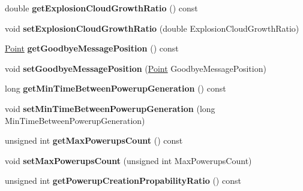 \begin{DoxyCompactItemize}
\item 
double {\bfseries get\+Explosion\+Cloud\+Growth\+Ratio} () const \hypertarget{classGameConfiguration_a987f4641ac6a04e60aabcf40022a42fc}{}\label{classGameConfiguration_a987f4641ac6a04e60aabcf40022a42fc}

\item 
void {\bfseries set\+Explosion\+Cloud\+Growth\+Ratio} (double Explosion\+Cloud\+Growth\+Ratio)\hypertarget{classGameConfiguration_a14d98de8fa9361f156856311d9a4be4e}{}\label{classGameConfiguration_a14d98de8fa9361f156856311d9a4be4e}

\item 
\hyperlink{classPoint}{Point} {\bfseries get\+Goodbye\+Message\+Position} () const \hypertarget{classGameConfiguration_a4c39731ab4053f37f205a48d4de45db1}{}\label{classGameConfiguration_a4c39731ab4053f37f205a48d4de45db1}

\item 
void {\bfseries set\+Goodbye\+Message\+Position} (\hyperlink{classPoint}{Point} Goodbye\+Message\+Position)\hypertarget{classGameConfiguration_af1594e686be0257e74c64488f9e03e81}{}\label{classGameConfiguration_af1594e686be0257e74c64488f9e03e81}

\item 
long {\bfseries get\+Min\+Time\+Between\+Powerup\+Generation} () const \hypertarget{classGameConfiguration_a8fcbe588703beb46282310da7865b711}{}\label{classGameConfiguration_a8fcbe588703beb46282310da7865b711}

\item 
void {\bfseries set\+Min\+Time\+Between\+Powerup\+Generation} (long Min\+Time\+Between\+Powerup\+Generation)\hypertarget{classGameConfiguration_af9d45ff31ec41b972cc0e367475db7ab}{}\label{classGameConfiguration_af9d45ff31ec41b972cc0e367475db7ab}

\item 
unsigned int {\bfseries get\+Max\+Powerups\+Count} () const \hypertarget{classGameConfiguration_aa3a5987c7cf509111734d77faefb6f13}{}\label{classGameConfiguration_aa3a5987c7cf509111734d77faefb6f13}

\item 
void {\bfseries set\+Max\+Powerups\+Count} (unsigned int Max\+Powerups\+Count)\hypertarget{classGameConfiguration_a26cd4c01c3adb929a4990d6c4f3a5fa7}{}\label{classGameConfiguration_a26cd4c01c3adb929a4990d6c4f3a5fa7}

\item 
unsigned int {\bfseries get\+Powerup\+Creation\+Propability\+Ratio} () const \hypertarget{classGameConfiguration_ad23f8faab3b63283db26ba99429c0207}{}\label{classGameConfiguration_ad23f8faab3b63283db26ba99429c0207}


\end{DoxyCompactItemize}
